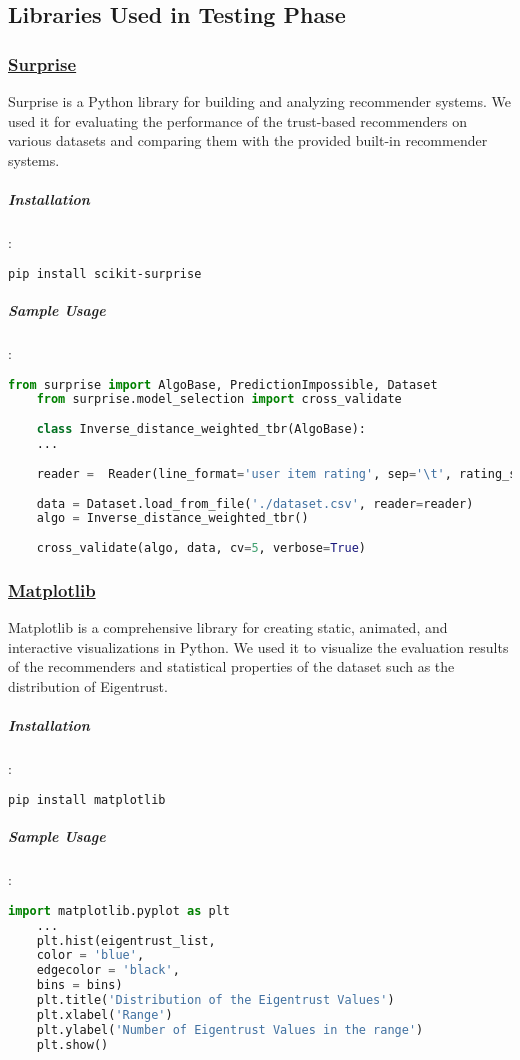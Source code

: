 \subsection{Libraries Used in Testing Phase}
\subsubsection{\href{http://surpriselib.com/}{Surprise}} 
Surprise is a Python library for building and analyzing recommender systems. We used it for evaluating the performance of the trust-based recommenders on various datasets and comparing them with the provided built-in recommender systems.
\label{surprise}
\subparagraph{Installation}:
\begin{lstlisting}[language=bash]
	pip install scikit-surprise
\end{lstlisting}

\subparagraph{Sample Usage}:
\begin{lstlisting}[language=python, caption=Surprise example]
	from surprise import AlgoBase, PredictionImpossible, Dataset
	from surprise.model_selection import cross_validate
	
	class Inverse_distance_weighted_tbr(AlgoBase):
	...
	
	reader =  Reader(line_format='user item rating', sep='\t', rating_scale=(1, 5))
	
	data = Dataset.load_from_file('./dataset.csv', reader=reader)
	algo = Inverse_distance_weighted_tbr()
	
	cross_validate(algo, data, cv=5, verbose=True)
\end{lstlisting}

\subsubsection{\href{https://matplotlib.org/}{Matplotlib}}
Matplotlib is a comprehensive library for creating static, animated, and interactive visualizations in Python. We used it to visualize the evaluation results of the recommenders and  statistical properties of the dataset such as the distribution of Eigentrust.
\subparagraph{Installation}:
\begin{lstlisting}[language=bash]
	pip install matplotlib
\end{lstlisting}

\subparagraph{Sample Usage}:
\begin{lstlisting}[language=python, caption=Matplotlib example]
	import matplotlib.pyplot as plt
	...
	plt.hist(eigentrust_list, 
	color = 'blue', 
	edgecolor = 'black',
	bins = bins)
	plt.title('Distribution of the Eigentrust Values')
	plt.xlabel('Range')
	plt.ylabel('Number of Eigentrust Values in the range')
	plt.show() 
\end{lstlisting}